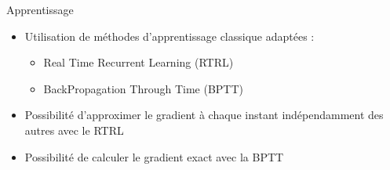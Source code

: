 \begin{frame}{Apprentissage}
    \begin{itemize}
        \item Utilisation de méthodes d'apprentissage classique adaptées :
            \begin{itemize}
                \item Real Time Recurrent Learning (RTRL) \cite{Robinson87}
                \item BackPropagation Through Time (BPTT) \cite{Williams95}
            \end{itemize}
        \item Possibilité d'approximer le gradient à chaque instant indépendamment des autres avec le RTRL
        \item Possibilité de calculer le gradient exact avec la BPTT \cite{Graves05b}
    \end{itemize}
\end{frame}